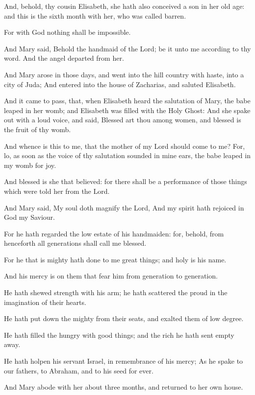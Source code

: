 \verse And, behold, thy cousin Elisabeth, she hath also conceived a son in her old age: and this is the sixth month with her, who was called barren.

\verse For with God nothing shall be impossible.

\verse And Mary said, Behold the handmaid of the Lord; be it unto me according to thy word. And the angel departed from her.

\verse And Mary arose in those days, and went into the hill country with haste, into a city of Juda; \verse And entered into the house of Zacharias, and saluted Elisabeth.

\verse And it came to pass, that, when Elisabeth heard the salutation of Mary, the babe leaped in her womb; and Elisabeth was filled with the Holy Ghost: \verse And she spake out with a loud voice, and said, Blessed art thou among women, and blessed is the fruit of thy womb.

\verse And whence is this to me, that the mother of my Lord should come to me?  \verse For, lo, as soon as the voice of thy salutation sounded in mine ears, the babe leaped in my womb for joy.

\verse And blessed is she that believed: for there shall be a performance of those things which were told her from the Lord.

\verse And Mary said, My soul doth magnify the Lord, \verse And my spirit hath rejoiced in God my Saviour.

\verse For he hath regarded the low estate of his handmaiden: for, behold, from henceforth all generations shall call me blessed.

\verse For he that is mighty hath done to me great things; and holy is his name.

\verse And his mercy is on them that fear him from generation to generation.

\verse He hath shewed strength with his arm; he hath scattered the proud in the imagination of their hearts.

\verse He hath put down the mighty from their seats, and exalted them of low degree.

\verse He hath filled the hungry with good things; and the rich he hath sent empty away.

\verse He hath holpen his servant Israel, in remembrance of his mercy; \verse As he spake to our fathers, to Abraham, and to his seed for ever.

\verse And Mary abode with her about three months, and returned to her own house.

